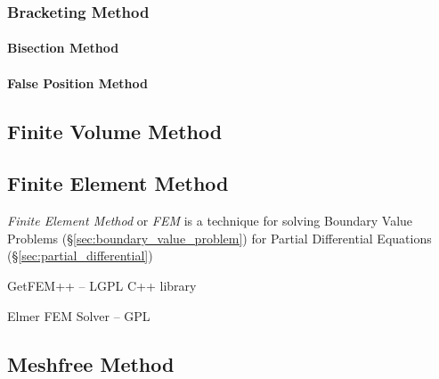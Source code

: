 \subsubsection{Bracketing Method}\label{sec:bracketing_method}

\paragraph{Bisection Method}\label{sec:bisection_method}\hfill

\paragraph{False Position Method}\label{sec:false_position}\hfill



\subsection{Finite Volume Method}\label{sec:finite_volume_method}

\subsection{Finite Element Method}\label{sec:finite_element_method}

\emph{Finite Element Method} or \emph{FEM} is a technique for solving Boundary
Value Problems (\S\ref{sec:boundary_value_problem}) for Partial Differential
Equations (\S\ref{sec:partial_differential})

GetFEM++ -- LGPL C++ library

Elmer FEM Solver -- GPL



\subsection{Meshfree Method}\label{sec:meshfree_method}

